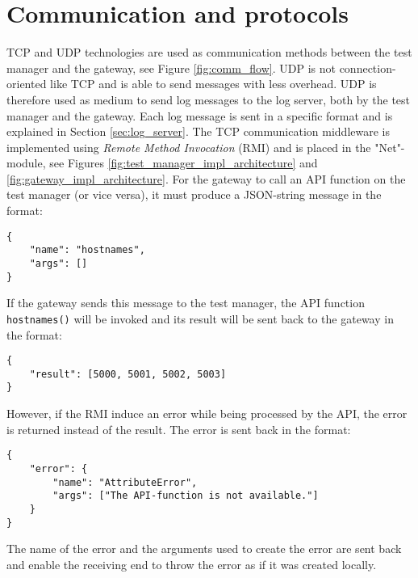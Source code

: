 \section{Communication and protocols}

TCP and UDP technologies are used as communication methods between the test
manager and the gateway, see Figure \ref{fig:comm_flow}. UDP is not
connection-oriented like TCP and is able to send messages with less overhead.
UDP is therefore used as medium to send log messages to the log server, both by
the test manager and the gateway. Each log message is sent in a specific format
and is explained in Section \ref{sec:log_server}. The TCP communication
middleware is implemented using \textit{Remote Method Invocation} (RMI)
\cite{coulouris2005distributed} and is placed in the "Net"-module, see Figures
\ref{fig:test_manager_impl_architecture} and
\ref{fig:gateway_impl_architecture}. For the gateway to call an API function on
the test manager (or vice versa), it must produce a JSON-string message in the
format:

\begin{lstlisting}
{
    "name": "hostnames",
    "args": []
}
\end{lstlisting}

If the gateway sends this message to the test manager, the API function
\texttt{hostnames()} will be invoked and its result will be sent back to the
gateway in the format:

\begin{lstlisting}
{
    "result": [5000, 5001, 5002, 5003]
}
\end{lstlisting}

However, if the RMI induce an error while being processed by the API, the error
is returned instead of the result. The error is sent back in the format:

\begin{lstlisting}
{
    "error": {
        "name": "AttributeError",
        "args": ["The API-function is not available."]
    }
}
\end{lstlisting}

The name of the error and the arguments used to create the error are sent back
and enable the receiving end to throw the error as if it was created locally.

